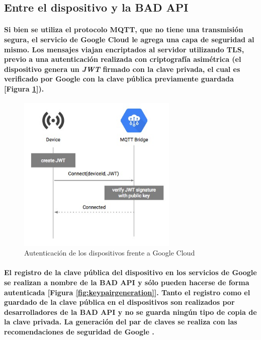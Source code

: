 \documentclass{article}
\begin{document}
\subsection{Entre el dispositivo y la BAD API}
\paragraph{
Si bien se utiliza el protocolo MQTT, que no tiene una transmisión segura, el servicio de Google Cloud le agrega una capa de seguridad al mismo. Los mensajes viajan encriptados al servidor utilizando TLS, previo a una autenticación realizada con criptografía asimétrica (el dispositivo genera un \textit{JWT} firmado con la clave privada, el cual es verificado por Google con la clave pública previamente guardada [Figura \ref{fig:tokencreation}]).
}

\begin{figure}[ht]
    \centering
    \includegraphics[width=3in]{token-creation.jpeg}%
    \caption{Autenticación de los dispositivos frente a Google Cloud}
    \label{fig:tokencreation}
\end{figure}

\paragraph{
El registro de la clave pública del dispositivo en los servicios de Google se realizan a nombre de la BAD API y sólo pueden hacerse de forma autenticada [Figura \ref{fig:keypairgeneration}]. Tanto el registro como el guardado de la clave pública en el dispositivos son realizados por desarrolladores de la BAD API y no se guarda ningún tipo de copia de la clave privada. La generación del par de claves se realiza con las recomendaciones de seguridad de Google \cite{GoogleIotSecurity}.
}
\end{document}
